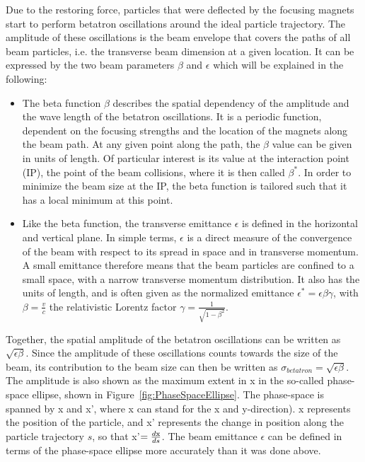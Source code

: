 Due to the restoring force, particles that were deflected by the focusing magnets start to perform betatron oscillations around the ideal particle trajectory.
The amplitude of these oscillations is the beam envelope that covers the paths of all beam particles, i.e. the transverse beam dimension at a given location.
It can be expressed by the two beam parameters $\beta$ and $\epsilon$ which will be explained in the following:
\begin{itemize}
 \item The beta function $\beta$ describes the spatial dependency of the amplitude and the wave length of the betatron oscillations.
It is a periodic function, dependent on the focusing strengths and the location of the magnets along the beam path.
At any given point along the path, the $\beta$ value can be given in units of length.
Of particular interest is its value at the interaction point (IP), the point of the beam collisions, where it is then called $\beta^*$.
In order to minimize the beam size at the IP, the beta function is tailored such that it has a local minimum at this point.  
\item Like the beta function, the transverse emittance $\epsilon$ is defined in the horizontal and vertical plane.
In simple terms, $\epsilon$ is a direct measure of the convergence of the beam with respect to its spread in space and in transverse momentum.
A small emittance therefore means that the beam particles are confined to a small space, with a narrow transverse momentum distribution.
It also has the units of length, and is often given as the normalized emittance $\epsilon^* = \epsilon\beta\gamma$, with $\beta=\frac{v}{c}$ the relativistic Lorentz factor $\gamma=\frac{1}{\sqrt{1-\beta^2}}$.
\end{itemize}
Together, the spatial amplitude of the betatron oscillations can be written as $\sqrt{\epsilon\beta}$.
Since the amplitude of these oscillations counts towards the size of the beam, its contribution to the beam size can then be written as $\sigma_{betatron} = \sqrt{\epsilon\beta}$.
The amplitude is also shown as the maximum extent in x in the so-called phase-space ellipse, shown in Figure~\ref{fig:PhaseSpaceEllipse}.
The phase-space is spanned by x and x', where x can stand for the x and y-direction). 
x represents the position of the particle, and x' represents the change in position along the particle trajectory $s$, so that x'$=\frac{d\rm{x}}{ds}$.
The beam emittance $\epsilon$ can be defined in terms of the phase-space ellipse more accurately than it was done above.

